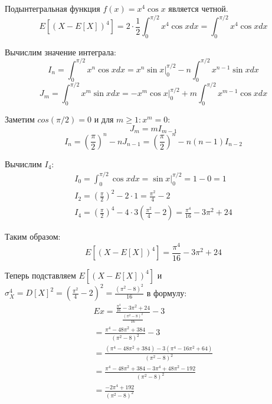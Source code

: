 \documentclass[a4paper,14pt]{extarticle}
\begin{document}
            Подынтегральная функция $f(x) = x^4 \cos x$ является четной.
            $$
            E[(X - E[X])^4] = 2 \cdot \frac{1}{2} \int_{0}^{\pi/2} x^4 \cos x dx = \int_{0}^{\pi/2} x^4 \cos x dx
            $$
            
            Вычислим значение интеграла:
            $$
            I_{n} =
            \int_{0}^{\pi/2} x^n \cos x dx =
            x^n \sin x |^{\pi/2}_{0} -
            n \int_{0}^{\pi/2} x^{n-1} \sin x dx
            $$
            $$
            J_{m} =
            \int_{0}^{\pi/2} x^m \sin x dx =
            -x^m \cos x |^{\pi/2}_{0} +
            m \int_{0}^{\pi/2} x^{m-1} \cos x dx
            $$
            
            Заметим $cos(\pi/2) = 0$ и для $m \ge 1: x^m = 0$:
            $$
            J_{m} = m I_{m-1}
            $$
            $$
            I_{n} =
            \left(\frac{\pi}{2}\right)^n - n J_{n-1} =
            \left(\frac{\pi}{2}\right)^n - n (n - 1) I_{n-2}
            $$
            
            Вычислим $I_4$:
            \begin{gather*}
                I_0 =
                \int_{0}^{\pi/2} \cos x dx =
                \sin x |^{\pi/2}_{0} = 1 - 0 = 1 \\
                I_2 =
                \left(\frac{\pi}{2}\right)^2 - 2 \cdot 1
                = \frac{\pi^2}{4} - 2 \\
                I_4 =
                \left(\frac{\pi}{2}\right)^4 -
                4 \cdot 3 \left(\frac{\pi^2}{4} - 2\right) =
                \frac{\pi^4}{16} - 3\pi^2 + 24
            \end{gather*}
            
            Таким образом:
            $$
            E[(X - E[X])^4] = \frac{\pi^4}{16} - 3\pi^2 + 24
            $$
            
            Теперь подставляем $E[(X - E[X])^4]$ и $\sigma_X^4 = D[X]^2 = \left(\frac{\pi^2}{4} - 2\right)^2 = \frac{(\pi^2 - 8)^2}{16}$ в формулу:
            \begin{gather*}
                Ex = \frac{\frac{\pi^4}{16} - 3\pi^2 + 24}{\frac{(\pi^2 - 8)^2}{16}} - 3 \\
                = \frac{\pi^4 - 48\pi^2 + 384}{(\pi^2 - 8)^2} - 3 \\
                = \frac{(\pi^4 - 48\pi^2 + 384) - 3(\pi^4 - 16\pi^2 + 64)}{(\pi^2 - 8)^2} \\
                = \frac{\pi^4 - 48\pi^2 + 384 - 3\pi^4 + 48\pi^2 - 192}{(\pi^2 - 8)^2} \\
                = \frac{-2\pi^4 + 192}{(\pi^2 - 8)^2}
            \end{gather*}
            
\end{document}
